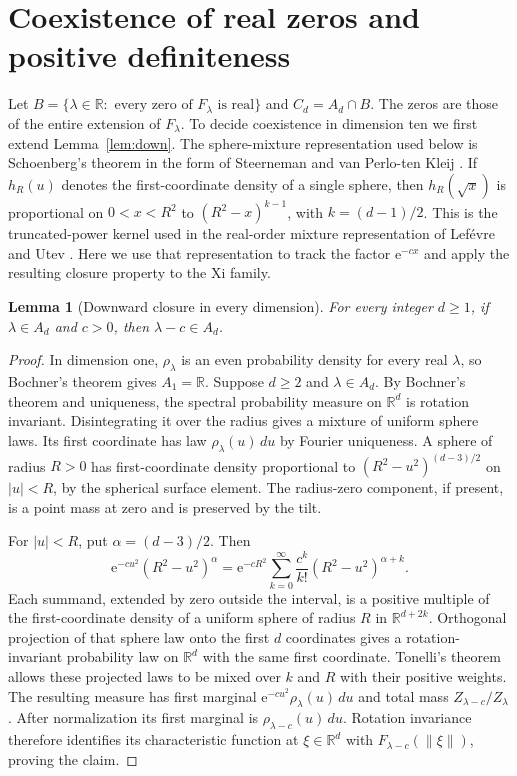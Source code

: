 \documentclass[11pt]{article}
\newtheorem{lemma}[theorem]{Lemma}
\theoremstyle{remark}
\newcommand{\R}{\mathbb{R}}
\newcommand{\ee}{\mathrm{e}}
\begin{document}
\section{Coexistence of real zeros and positive definiteness}\label{sec:coexist}
Let $B=\{\lambda\in\R:\text{ every zero of }F_\lambda\text{ is real}\}$
and $C_d=A_d\cap B$. The zeros are those of the entire extension of $F_\lambda$.
To decide coexistence in dimension ten we first extend Lemma~\ref{lem:down}.
The sphere-mixture representation used below is Schoenberg's theorem
in the form of Steerneman and van Perlo-ten Kleij \cite[Theorem~1]{SV}.
If $h_R(u)$ denotes the first-coordinate density of a single sphere,
then $h_R(\sqrt{x})$ is proportional on $0<x<R^2$ to $(R^2-x)^{k-1}$, with $k=(d-1)/2$.
This is the truncated-power kernel used in the real-order mixture
representation of Lef\'evre and Utev \cite[eq.~(1.1)]{LU}.
Here we use that representation to track the factor $\ee^{-cx}$ and
apply the resulting closure property to the Xi family.


\begin{lemma}[Downward closure in every dimension]\label{lem:down-all}
For every integer $d\ge1$, if $\lambda\in A_d$ and $c>0$, then $\lambda-c\in A_d$.
\end{lemma}
\begin{proof}
In dimension one, $\rho_\lambda$ is an even probability density for every real
$\lambda$, so Bochner's theorem gives $A_1=\R$. Suppose $d\ge2$ and $\lambda\in A_d$.
By Bochner's theorem and uniqueness, the spectral probability measure on $\R^d$
is rotation invariant. Disintegrating it over the radius gives a mixture of
uniform sphere laws. Its first coordinate has law $\rho_\lambda(u)\,du$ by
Fourier uniqueness. A sphere of radius $R>0$ has first-coordinate density
proportional to $(R^2-u^2)^{(d-3)/2}$ on $|u|<R$, by the spherical
surface element. The radius-zero component, if present, is a point mass
at zero and is preserved by the tilt.

For $|u|<R$, put $\alpha=(d-3)/2$. Then
\[
 \ee^{-cu^2}(R^2-u^2)^\alpha
 =\ee^{-cR^2}\sum_{k=0}^\infty\frac{c^k}{k!}(R^2-u^2)^{\alpha+k}.
\]
Each summand, extended by zero outside the interval, is a positive multiple
of the first-coordinate density of a uniform sphere of radius $R$ in
$\R^{d+2k}$. Orthogonal projection of that sphere law onto the first $d$
coordinates gives a rotation-invariant probability law on $\R^d$ with the
same first coordinate. Tonelli's theorem allows these projected laws to
be mixed over $k$ and $R$ with their positive weights. The resulting
measure has first marginal $\ee^{-cu^2}\rho_\lambda(u)\,du$ and total mass
$Z_{\lambda-c}/Z_\lambda$. After normalization its first marginal is
$\rho_{\lambda-c}(u)\,du$. Rotation invariance therefore identifies its
characteristic function at $\xi\in\R^d$ with $F_{\lambda-c}(\|\xi\|)$,
proving the claim.
\end{proof}
\end{document}
